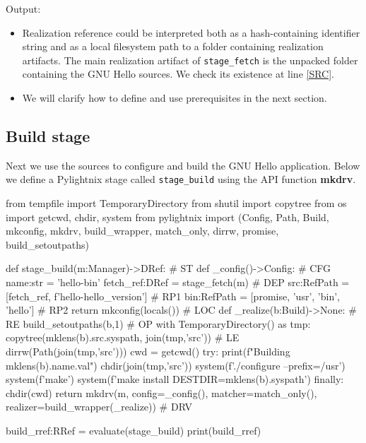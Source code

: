 \documentclass{article}
\newenvironment{pythontexcode}
  {\VerbatimEnvironment\begin{mdframed}[leftline=false,rightline=false]\begin{pyblock}[stdout][numbers=left]}
  {\end{pyblock}\end{mdframed}}
\newcommand{\mysmallstdout}{\begin{mdframed}\footnotesize{\texttt{\stdoutpythontex[verbatim][breaklines,breakafter=0123456789-/]}}\end{mdframed}}
\begin{document}
Output:

\mysmallstdout

\begin{itemize}
  \item Realization reference could be interpreted both as a
    hash-containing identifier string and as a local filesystem path to a
    folder containing realization artifacts. The main realization artifact
    of \texttt{stage\_fetch} is the unpacked folder containing the GNU
    Hello sources. We check its existence at line \ref{SRC}.
  \item We will clarify how to define and use prerequisites in the next
    section.
\end{itemize}

\pagebreak

\subsection{Build stage}

Next we use the sources to configure and build the GNU Hello
application. Below we define a Pylightnix stage called
\texttt{stage\_build} using the API function \textbf{mkdrv}.

\begin{pythontexcode}
from tempfile import TemporaryDirectory
from shutil import copytree
from os import getcwd, chdir, system
from pylightnix import (Config, Path, Build, mkconfig, mkdrv,
  build_wrapper, match_only, dirrw, promise, build_setoutpaths)

def stage_build(m:Manager)->DRef:                            # ST \label{ST}
  def _config()->Config:                                     # CFG \label{CFG}
    name:str = 'hello-bin'
    fetch_ref:DRef = stage_fetch(m)                          # DEP \label{DEP}
    src:RefPath = [fetch_ref, f'hello-{hello_version}']      # RP1 \label{RP1}
    bin:RefPath = [promise, 'usr', 'bin', 'hello']           # RP2 \label{RP2}
    return mkconfig(locals())                                # LOC \label{LOC}
  def _realize(b:Build)->None:                               # RE \label{RE}
    build_setoutpaths(b,1)                                   # OP \label{OP}
    with TemporaryDirectory() as tmp:
      copytree(mklens(b).src.syspath, join(tmp,'src'))       # LE \label{LE}
      dirrw(Path(join(tmp,'src')))
      cwd = getcwd()
      try:
        print(f"Building {mklens(b).name.val}")
        chdir(join(tmp,'src'))
        system(f'./configure --prefix=/usr')
        system(f'make')
        system(f'make install DESTDIR={mklens(b).syspath}')
      finally:
        chdir(cwd)
  return mkdrv(m, config=_config(),
                  matcher=match_only(),
                  realizer=build_wrapper(_realize))          # DRV \label{DRV}

build_rref:RRef = evaluate(stage_build)
print(build_rref)
\end{pythontexcode}
\end{document}
